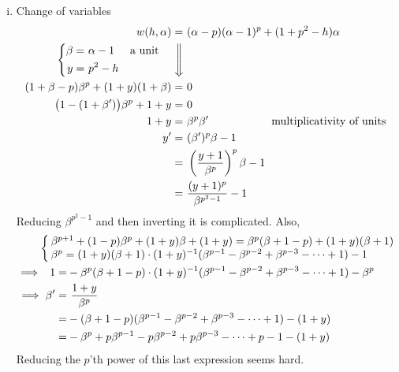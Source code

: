 \documentclass{rs}
\theoremstyle{definition}
\theoremstyle{remark}
\newcommand{\A}{\alpha}
\newcommand{\B}{\beta}
\renewcommand{\=}{\approx}
\renewcommand{\-}{\sim}
\numberwithin{equation}{section}
\begin{document}
\begin{enumerate}[(i)]
 \item Change of variables 
 \[
  \begin{split}
                                  w(h,\A) = & ~ (\A - p) (\A - 1)^p + (1 + p^2 - h) \A \\
                           \left\{
                            \begin{split}
                             \B = & ~ \A - 1 \hskip .5cm \text{a unit} \hskip .5cm \\
                              y = & ~ p^2 - h 
                            \end{split}
                           \right\Downarrow & \\
     (1 + \B - p) \B^p + (1 + y) (1 + \B) = & ~ 0 \\
   \big( 1 - (1 + \B') \big) \B^p + 1 + y = & ~ 0 \\
                                    1 + y = & ~ \B^p \B' \hskip 2cm \text{multiplicativity of units} \\
                                       y' = & ~ (\B')^p \B - 1 \\
                                          = & ~ \left( \frac{y + 1}{\B^p} \right)^p \B - 1 \\
                                          = & ~ \frac{(y + 1)^p}{\B^{p^2 - 1}} - 1 
  \end{split}
 \]
 Reducing $\B^{p^2 - 1}$ and then inverting it is complicated.  Also, 
 \[
  \begin{split}
   & \hskip -.9cm \left\{\hskip -.11cm
     \begin{array}{l}
      \B^{p + 1} + (1 - p) \B^p + (1 + y) \B + (1 + y) = \B^p (\B + 1 - p) + (1 + y) (\B + 1) \\
      \B^p = (1 + y) (\B + 1) \cdot (1 + y)^{-1} (\B^{p - 1} - \B^{p - 2} + \B^{p - 3} - \cdots + 1) - 1 
     \end{array}
     \right. \\
   \implies ~\, 1 = & -\B^p (\B + 1 - p) \cdot (1 + y)^{-1} (\B^{p - 1} - \B^{p - 2} + \B^{p - 3} - \cdots + 1) - \B^p \\
     \implies \B' = & ~ \frac{1 + y}{\B^p} \\
                  = & -(\B + 1 - p) (\B^{p - 1} - \B^{p - 2} + \B^{p - 3} - \cdots + 1) - (1 + y) \\
                  = & -\B^p + p \B^{p - 1} - p \B^{p - 2} + p \B^{p - 3} - \cdots + p - 1 - (1 + y) 
  \end{split}
 \]
 Reducing the $p$'th power of this last expression seems hard.  
\end{enumerate}
\end{document}
